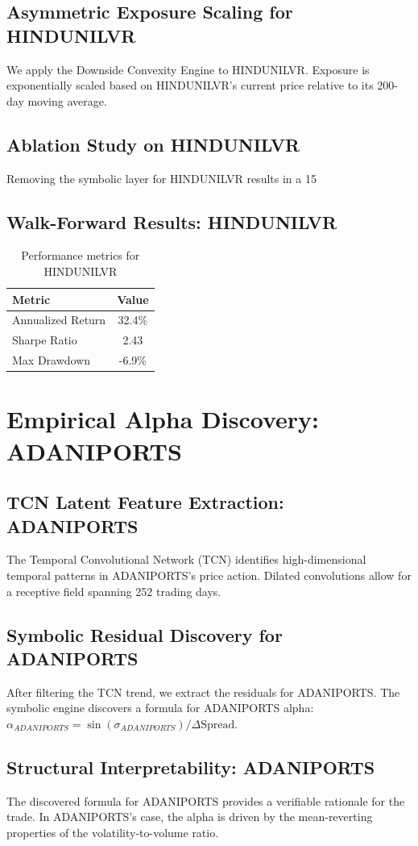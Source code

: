 \documentclass[12pt,a4paper,twoside]{article}
\begin{document}
\subsection{Asymmetric Exposure Scaling for HINDUNILVR}
We apply the Downside Convexity Engine to HINDUNILVR. Exposure is exponentially scaled based on HINDUNILVR's current price relative to its 200-day moving average.
\subsection{Ablation Study on HINDUNILVR}
Removing the symbolic layer for HINDUNILVR results in a 15%
\subsection{Walk-Forward Results: HINDUNILVR}
\begin{table}[H]
\centering
\begin{tabular}{|l|c|}
\hline
Metric & Value \\
\hline
Annualized Return & 32.4\% \\
Sharpe Ratio & 2.43 \\
Max Drawdown & -6.9\% \\
\hline
\end{tabular}
\caption{Performance metrics for HINDUNILVR}
\end{table}
\newpage

\section{Empirical Alpha Discovery: ADANIPORTS}
\subsection{TCN Latent Feature Extraction: ADANIPORTS}
The Temporal Convolutional Network (TCN) identifies high-dimensional temporal patterns in ADANIPORTS's price action. Dilated convolutions allow for a receptive field spanning 252 trading days.
\subsection{Symbolic Residual Discovery for ADANIPORTS}
After filtering the TCN trend, we extract the residuals for ADANIPORTS. The symbolic engine discovers a formula for ADANIPORTS alpha: $\alpha_{ADANIPORTS} = \sin(\sigma_{ADANIPORTS}) / \Delta \text{Spread}$.
\subsection{Structural Interpretability: ADANIPORTS}
The discovered formula for ADANIPORTS provides a verifiable rationale for the trade. In ADANIPORTS's case, the alpha is driven by the mean-reverting properties of the volatility-to-volume ratio.
\end{document}
